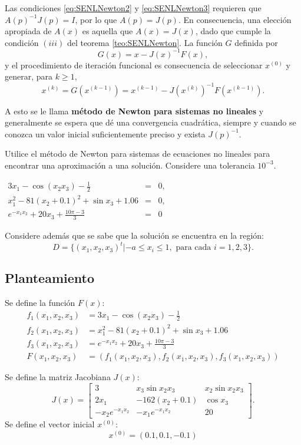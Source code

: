 Las condiciones \ref{eq:SENLNewton2} y \ref{eq:SENLNewton3} requieren que $A(p)^{-1}J(p) = I$, por lo que $A(p)=J(p)$. En
consecuencia, una elección apropiada de $A(x)$ es aquella que $A(x)=J(x)$, dado que cumple la condición $(iii)$ del teorema 
\ref{teo:SENLNewton}. La función $G$ definida por
\[
	G(x) = x - J(x)^{-1}F(x),
\]
y el procedimiento de iteración funcional es consecuencia de seleccionar $x^{(0)}$ y generar, para $k\geq 1$,
\[ 
	x^{(k)} = G\left(x^{(k-1)} \right) = x^{(k-1)} - J\left(x^{(k)}\right)^{-1}F\left(x^{(k-1)} \right).
\]

A esto se le llama \textbf{método de Newton para sistemas no lineales} y generalmente se espera que dé una convergencia 
cuadrática, siempre y cuando se conozca un valor inicial suficientemente preciso y exista $J(p)^{-1}$.

\begin{exerciseT}
Utilice el método de Newton para sistemas de ecuaciones no lineales para encontrar una aproximación a una solución. 
Considere una tolerancia $10^{-3}$.
\begin{center}
  $\begin{array}{rcl}
    3x_1 - \cos (x_2x_3) - \frac{1}{2} & = & 0,\\
    x_1^2 - 81(x_2 + 0.1)^2 + \sin x_3 + 1.06 & = & 0,\\
    e^{-x_1x_2} + 20x_3 + \frac{10\pi - 3}{3} & = & 0
  \end{array}$
\end{center}
Considere además que se sabe que la solución se encuentra en la región:
\[
	D=\{(x_1,x_2,x_3)^t | -a\leq x_i\leq 1, \mbox{ para cada } i=1,2,3\}.
\]

\subsection*{Planteamiento}
Se define la función $F(x)$:
\begin{align*}
	f_1(x_1,x_2,x_3) &= 3x_1 - \cos (x_2x_3) - \frac{1}{2} \\
	f_2(x_1,x_2,x_3) &= x_1^2 - 81(x_2 + 0.1)^2 + \sin x_3 + 1.06 \\
	f_3(x_1,x_2,x_3) &= e^{-x_1x_2} + 20x_3 + \frac{10\pi - 3}{3} \\
	F(x_1,x_2,x_3) &= \left(f_1(x_1,x_2,x_3), f_2(x_1,x_2,x_3), f_3(x_1,x_2,x_3) \right) 
\end{align*}

Se define la matriz Jacobiana $J(x)$:
\[
	J(x) = 
	\left[
	\begin{matrix}
		3 & x_3\sin x_2x_3 & x_2\sin x_2x_3 \\
		2x_1 & -162(x_2+0.1) & \cos x_3\\
		-x_2e^{-x_1x_2} & -x_1e^{-x_1x_2} & 20
	\end{matrix}
	\right].
\]
Se define el vector inicial $x^{(0)}$:
\[
	x^{(0)} = (0.1, 0.1, -0.1)
\]


\end{exerciseT}
